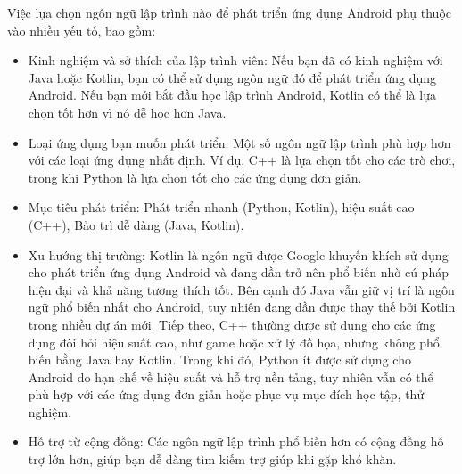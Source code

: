         Việc lựa chọn ngôn ngữ lập trình nào để phát triển ứng dụng Android phụ thuộc vào nhiều yếu tố, bao gồm:
        \setlength{\leftmargini}{1.5cm}
        \begin{itemize}
            \item Kinh nghiệm và sở thích của lập trình viên: Nếu bạn đã có kinh nghiệm với Java hoặc Kotlin, bạn có thể sử dụng ngôn ngữ đó để phát triển ứng dụng Android. Nếu bạn mới bắt đầu học lập trình Android, Kotlin có thể là lựa chọn tốt hơn vì nó dễ học hơn Java.
            \item Loại ứng dụng bạn muốn phát triển: Một số ngôn ngữ lập trình phù hợp hơn với các loại ứng dụng nhất định. Ví dụ, C++ là lựa chọn tốt cho các trò chơi, trong khi Python là lựa chọn tốt cho các ứng dụng đơn giản.
            \item Mục tiêu phát triển: Phát triển nhanh (Python, Kotlin), hiệu suất cao (C++), Bảo trì dễ dàng (Java, Kotlin).
            \item Xu hướng thị trường: Kotlin là ngôn ngữ được Google khuyến khích sử dụng cho phát triển ứng dụng Android và đang dần trở nên phổ biến nhờ cú pháp hiện đại và khả năng tương thích tốt. Bên cạnh đó Java vẫn giữ vị trí là ngôn ngữ phổ biến nhất cho Android, tuy nhiên đang dần được thay thế bởi Kotlin trong nhiều dự án mới. Tiếp theo, C++ thường được sử dụng cho các ứng dụng đòi hỏi hiệu suất cao, như game hoặc xử lý đồ họa, nhưng không phổ biến bằng Java hay Kotlin. Trong khi đó, Python ít được sử dụng cho Android do hạn chế về hiệu suất và hỗ trợ nền tảng, tuy nhiên vẫn có thể phù hợp với các ứng dụng đơn giản hoặc phục vụ mục đích học tập, thử nghiệm.        
            \item Hỗ trợ từ cộng đồng: Các ngôn ngữ lập trình phổ biến hơn có cộng đồng hỗ trợ lớn hơn, giúp bạn dễ dàng tìm kiếm trợ giúp khi gặp khó khăn.   
        \end{itemize}

